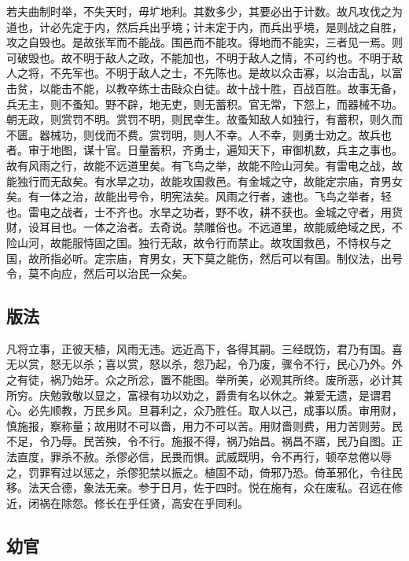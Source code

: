 \documentclass[]{article}
\begin{document}
若夫曲制时举，不失天时，毋圹地利。其数多少，其要必出于计数。故凡攻伐之为道也，计必先定于内，然后兵出乎境；计未定于内，而兵出乎境，是则战之自胜，攻之自毁也。是故张军而不能战。围邑而不能攻。得地而不能实，三者见一焉。则可破毁也。故不明于敌人之政，不能加也，不明于敌人之情，不可约也。不明于敌人之将，不先军也。不明于敌人之士，不先陈也。是故以众击寡，以治击乱，以富击贫，以能击不能，以教卒练士击敺众白徒。故十战十胜，百战百胜。故事无备，兵无主，则不蚤知。野不辟，地无吏，则无蓄积。官无常，下怨上，而器械不功。朝无政，则赏罚不明。赏罚不明，则民幸生。故蚤知敌人如独行，有蓄积，则久而不匮。器械功，则伐而不费。赏罚明，则人不幸。人不幸，则勇士劝之。故兵也者。审于地图，谋十官。日量蓄积，齐勇士，遍知天下，审御机数，兵主之事也。故有风雨之行，故能不远道里矣。有飞鸟之举，故能不险山河矣。有雷电之战，故能独行而无敌矣。有水旱之功，故能攻国救邑。有金城之守，故能定宗庙，育男女矣。有一体之治，故能出号令，明宪法矣。风雨之行者，速也。飞鸟之举者，轻也。雷电之战者，士不齐也。水旱之功者，野不收，耕不获也。金城之守者，用货财，设耳目也。一体之治者。去奇说。禁雕俗也。不远道里，故能威绝域之民，不险山河，故能服恃固之国。独行无敌，故令行而禁止。故攻国救邑，不恃权与之国，故所指必听。定宗庙，育男女，天下莫之能伤，然后可以有国。制仪法，出号令，莫不向应，然后可以治民一众矣。

\hypertarget{header-n110}{%
\subsection{版法}\label{header-n110}}

凡将立事，正彼天植，风雨无违。远近高下，各得其嗣。三经既饬，君乃有国。喜无以赏，怒无以杀；喜以赏，怒以杀，怨乃起，令乃废，骤令不行，民心乃外。外之有徒，祸乃始牙。众之所忿，置不能图。举所美，必观其所终。废所恶，必计其所穷。庆勉敦敬以显之，富禄有功以劝之，爵贵有名以休之。兼爱无遗，是谓君心。必先顺教，万民乡风。旦暮利之，众乃胜任。取人以己，成事以质。审用财，慎施报，察称量；故用财不可以嗇，用力不可以苦。用财嗇则费，用力苦则劳。民不足，令乃辱。民苦殃，令不行。施报不得，祸乃始昌。祸昌不寤，民乃自图。正法直度，罪杀不赦。杀僇必信，民畏而惧。武威既明，令不再行，顿卒怠倦以辱之，罚罪宥过以惩之，杀僇犯禁以振之。植固不动，倚邪乃恐。倚革邪化，令往民移。法天合德，象法无亲。参于日月，佐于四时。悦在施有，众在废私。召远在修近，闭祸在除怨。修长在乎任贤，高安在乎同利。

\hypertarget{header-n114}{%
\subsection{幼官}\label{header-n114}}
\end{document}
